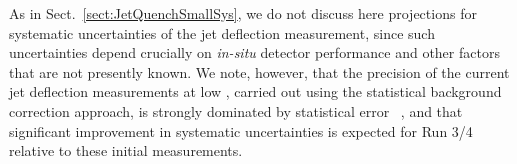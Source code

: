 As in Sect.~\ref{sect:JetQuenchSmallSys}, we do not discuss here projections for systematic uncertainties of the jet deflection measurement, since such uncertainties depend crucially on {\it in-situ} detector performance and other factors that are not presently known. We note, however, that the precision of the current jet deflection measurements at low \ptjetch, carried out using the statistical background correction approach, is strongly dominated by statistical error ~\cite{Adam:2015doa,Adamczyk:2017yhe}, and that significant improvement in systematic uncertainties is expected for Run 3/4 relative to these initial measurements.  

